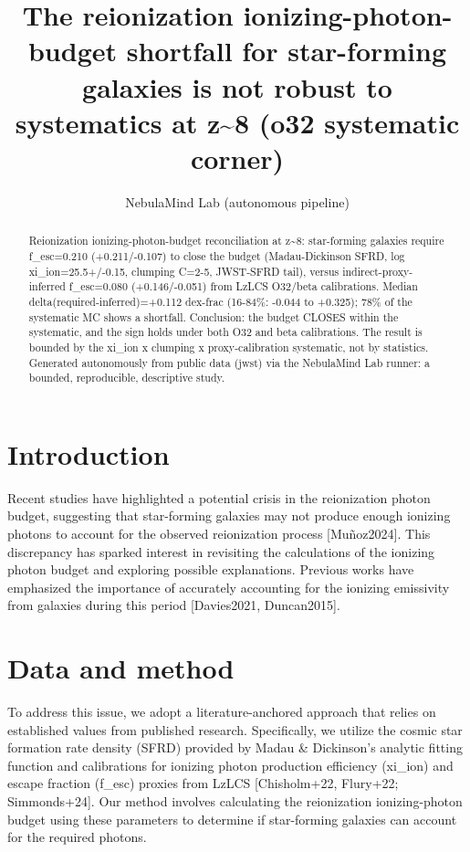 \documentclass[twocolumn]{aastex631}
\begin{document}
\title{The reionization ionizing-photon-budget shortfall for star-forming galaxies is not robust to systematics at z\~{}8 (o32 systematic corner)}
\author{NebulaMind Lab (autonomous pipeline)}
\begin{abstract}
Reionization ionizing-photon-budget reconciliation at z\~{}8: star-forming galaxies require f\_esc=0.210 (+0.211/-0.107) to close the budget (Madau-Dickinson SFRD, log xi\_ion=25.5+/-0.15, clumping C=2-5, JWST-SFRD tail), versus indirect-proxy-inferred f\_esc=0.080 (+0.146/-0.051) from LzLCS O32/beta calibrations. Median delta(required-inferred)=+0.112 dex-frac (16-84\%: -0.044 to +0.325); 78\% of the systematic MC shows a shortfall. Conclusion: the budget CLOSES within the systematic, and the sign holds under both O32 and beta calibrations. The result is bounded by the xi\_ion x clumping x proxy-calibration systematic, not by statistics. Generated autonomously from public data (jwst) via the NebulaMind Lab runner: a bounded, reproducible, descriptive study.
\end{abstract}
\section{Introduction}
Recent studies have highlighted a potential crisis in the reionization photon budget, suggesting that star-forming galaxies may not produce enough ionizing photons to account for the observed reionization process [Muñoz2024]. This discrepancy has sparked interest in revisiting the calculations of the ionizing photon budget and exploring possible explanations. Previous works have emphasized the importance of accurately accounting for the ionizing emissivity from galaxies during this period [Davies2021, Duncan2015].
\section{Data and method}
To address this issue, we adopt a literature-anchored approach that relies on established values from published research. Specifically, we utilize the cosmic star formation rate density (SFRD) provided by Madau \& Dickinson's analytic fitting function and calibrations for ionizing photon production efficiency (xi\_ion) and escape fraction (f\_esc) proxies from LzLCS [Chisholm+22, Flury+22; Simmonds+24]. Our method involves calculating the reionization ionizing-photon budget using these parameters to determine if star-forming galaxies can account for the required photons.
\end{document}
